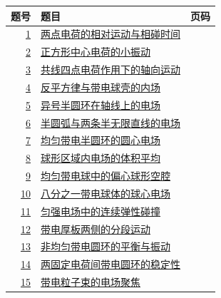\documentclass[UTF8,fontset=fandol,a4paper,11pt]{ctexart}
\begin{document}
\begin{longtable}{@{}r p{113mm} r@{}}\toprule 题号 & 题目 & 页码\\\midrule

\hyperref[q:1]{1} & \hyperref[q:1]{两点电荷的相对运动与相碰时间} & \pageref{q:1} \\

\hyperref[q:2]{2} & \hyperref[q:2]{正方形中心电荷的小振动} & \pageref{q:2} \\

\hyperref[q:3]{3} & \hyperref[q:3]{共线四点电荷作用下的轴向运动} & \pageref{q:3} \\

\hyperref[q:4]{4} & \hyperref[q:4]{反平方律与带电球壳的内场} & \pageref{q:4} \\

\hyperref[q:5]{5} & \hyperref[q:5]{异号半圆环在轴线上的电场} & \pageref{q:5} \\

\hyperref[q:6]{6} & \hyperref[q:6]{半圆弧与两条半无限直线的电场} & \pageref{q:6} \\

\hyperref[q:7]{7} & \hyperref[q:7]{均匀带电半圆环的圆心电场} & \pageref{q:7} \\

\hyperref[q:8]{8} & \hyperref[q:8]{球形区域内电场的体积平均} & \pageref{q:8} \\

\hyperref[q:9]{9} & \hyperref[q:9]{均匀带电球中的偏心球形空腔} & \pageref{q:9} \\

\hyperref[q:10]{10} & \hyperref[q:10]{八分之一带电球体的球心电场} & \pageref{q:10} \\

\hyperref[q:11]{11} & \hyperref[q:11]{匀强电场中的连续弹性碰撞} & \pageref{q:11} \\

\hyperref[q:12]{12} & \hyperref[q:12]{带电厚板两侧的分段运动} & \pageref{q:12} \\

\hyperref[q:13]{13} & \hyperref[q:13]{非均匀带电圆环的平衡与振动} & \pageref{q:13} \\

\hyperref[q:14]{14} & \hyperref[q:14]{两固定电荷间带电圆环的稳定性} & \pageref{q:14} \\

\hyperref[q:15]{15} & \hyperref[q:15]{带电粒子束的电场聚焦} & \pageref{q:15} \\


\end{longtable}
\end{document}
